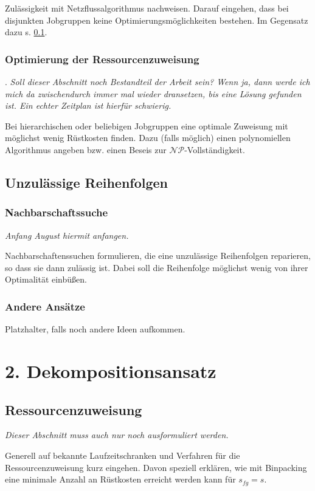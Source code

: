 \documentclass{scrreprt}
\begin{document}
Zulässigkeit mit Netzflussalgorithmus nachweisen.
Darauf eingehen, dass bei disjunkten Jobgruppen keine Optimierungsmöglichkeiten bestehen.
Im Gegensatz dazu s. \ref{subsec:optres}.


\subsection{Optimierung der Ressourcenzuweisung}
\label{subsec:optres}.
\textit{Soll dieser Abschnitt noch Bestandteil der Arbeit sein? Wenn ja, dann werde ich mich da zwischendurch immer mal wieder dransetzen,
bis eine Lösung gefunden ist. Ein echter Zeitplan ist hierfür schwierig.}

Bei hierarchischen oder beliebigen Jobgruppen eine optimale Zuweisung mit möglichst wenig Rüstkosten finden.
Dazu (falls möglich) einen polynomiellen Algorithmus angeben bzw. einen Beseis zur $\mathcal{NP}$-Vollständigkeit.

\section{Unzulässige Reihenfolgen}
\subsection{Nachbarschaftssuche}
\textit{Anfang August hiermit anfangen.}

Nachbarschaftenssuchen formulieren, die eine unzulässige Reihenfolgen reparieren, so dass sie dann zulässig ist.
Dabei soll die Reihenfolge möglichst wenig von ihrer Optimalität einbüßen.

\subsection{Andere Ansätze}
Platzhalter, falls noch andere Ideen aufkommen.


\chapter{2. Dekompositionsansatz}
\section{Ressourcenzuweisung}
\textit{Dieser Abschnitt muss auch nur noch ausformuliert werden.}

Generell auf bekannte Laufzeitschranken und Verfahren für die Ressourcenzuweisung kurz eingehen.
Davon speziell erklären, wie mit Binpacking eine minimale Anzahl an Rüstkosten erreicht werden kann für $s_{fg}=s$.
\end{document}
